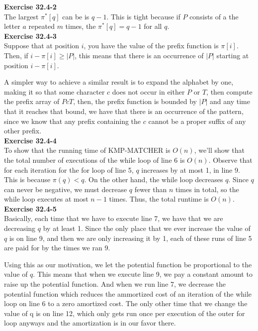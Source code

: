 \documentclass{article}
\begin{document}
\noindent\textbf{Exercise 32.4-2}\\

The largest $\pi^*[q]$ can be is $q-1$.  This is tight because if $P$ consists of a the letter $a$ repeated $m$ times, the $\pi^*[q] = q-1$ for all $q$. \\



\noindent\textbf{Exercise 32.4-3}\\

Suppose that at position $i$, you have the value of the prefix function is $\pi[i]$. Then, if $i-\pi[i] \ge|P| $, this means that there is an occurrence of $|P|$ starting at position $i-\pi[i]$. 

A simpler way to achieve a similar result is to expand the alphabet by one, making it so that some character $c$ does not occur in either $P$ or $T$, then compute the prefix array of $PcT$, then, the prefix function is bounded by $|P|$ and any time that it reaches that bound, we have that there is an occurrence of the pattern, since we know that any prefix containing the $c$ cannot be a proper suffix of any other prefix.\\

\noindent\textbf{Exercise 32.4-4}\\

To show that the running time of KMP-MATCHER is $O(n)$, we'll show that the total number of executions of the while loop of line 6 is $O(n)$.  Observe that for each iteration for the for loop of line 5, $q$ increases by at most 1, in line 9.  This is because $\pi(q) < q$.  On the other hand, the while loop decreases $q$.  Since $q$ can never be negative, we must decrease $q$ fewer than $n$ times in total, so the while loop executes at most $n-1$ times.  Thus, the total runtime is $O(n)$. \\


\noindent\textbf{Exercise 32.4-5}\\

Basically, each time that we have to execute line 7, we have that we are decreasing $q$ by at least 1. Since the only place that we ever increase the value of $q$ is on line 9, and then we are only increasing it by 1, each of these runs of line 5 are paid for by the times we ran 9.

Using this as our motivation, we let the potential function be proportional to the value of $q$. This means that when we execute line 9, we pay a constant amount to raise up the potential function. And when we run line 7, we decrease the potential function which reduces the ammortized cost of an iteration of the while loop on line 6 to a zero amortized cost. The only other time that we change the value of q is on line 12, which only gets run once per execution of the outer for loop anyways and the amortization is in our favor there.
\end{document}
